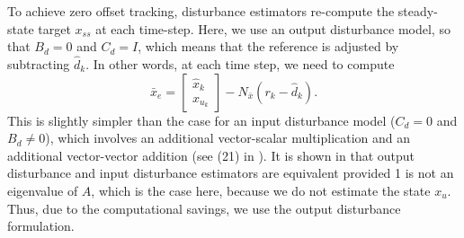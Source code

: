 \documentclass[twocolumn,twoside]{IEEEtran}
\newcommand{\x}{\ensuremath{x }\xspace}
\begin{document}
To achieve zero offset tracking, disturbance estimators re-compute the steady-state target $\x_{ss}$ at each time-step. Here, we use an output disturbance model, so that $B_d=0$ and $C_d=I$, which means that the reference is adjusted by subtracting $\hat d_k$. In other words, at each time step, we need to compute
\begin{equation}
  \bar{x}_{e} =
  \begin{bmatrix}\hat{x}_k\\x_{u_k}
  \end{bmatrix}
  - N_{\bar{x}}(r_k - \hat{d}_k).\nonumber
\end{equation}
This is slightly simpler than the case for an input disturbance model ($C_d=0$ and $B_d\neq0$), which involves an additional vector-scalar multiplication and an additional vector-vector addition (see (21) in \cite{maeder_offset-free_2007}). It is shown in \cite{maeder_offset-free_2007} that output disturbance and input disturbance estimators are equivalent provided 1 is not an eigenvalue of $A$, which is the case here, because we do not estimate the state $x_u$. Thus, due to the computational savings, we use the output disturbance formulation. 
\end{document}
